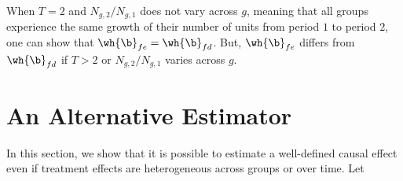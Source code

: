 \documentclass[12pt]{article}
\newcommand{\CiteReference}{../Notes/reference.bib}
\theoremstyle{definition}
\begin{document}
When $T=2$ and $N_{g,2}/N_{g,1}$ does not vary across $g$, meaning that all groups experience the same growth of their number of units from period $1$ to period $2$, one can show that $\wh{\b}_{fe} = \wh{\b}_{fd}$. But, $\wh{\b}_{fe}$ differs from $\wh{\b}_{fd}$ if $T > 2$ or $N_{g,2}/N_{g,1}$ varies across $g$.

\section{An Alternative Estimator}

In this section, we show that it is possible to estimate a well-defined causal effect even if treatment effects are heterogeneous across groups or over time. Let 



\end{document}
